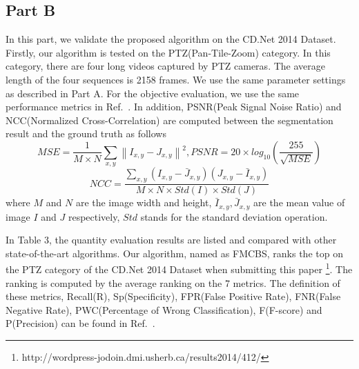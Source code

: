 \subsection{Part B}
In this part, we validate the proposed algorithm on the CD.Net 2014 Dataset\cite{CD2014}. Firstly, our algorithm is tested on the PTZ(Pan-Tile-Zoom) category. In this category, there are four long videos captured by PTZ cameras. The average length of the four sequences is 2158 frames. We use the same parameter settings as described in Part A. For the objective evaluation, we use the same performance metrics in Ref.~. In addition, PSNR(Peak Signal Noise Ratio) and NCC(Normalized Cross-Correlation) are computed between the segmentation result and the ground truth as follows $$MSE=\frac{1}{M\times N}\sum_{x,y}\left \| I_{x,y}-J_{x,y} \right \|^{2},PSNR = 20\times log_{10}\left ( \frac{255}{\sqrt{MSE}}\right )$$
$$NCC=\frac{\sum_{x,y}\left( I_{x,y}-\bar J_{x,y}\right )\left(J_{x,y}- \bar I_{x,y} \right )}{M\times N\times Std(I) \times Std(J)}$$ where $M$ and $N$ are the image width and height, $\bar I_{x,y},\bar J_{x,y}$ are the mean value of image $I$ and $J$ respectively, $Std$ stands for the standard deviation operation.\par
 In Table 3, the quantity evaluation results are listed and compared with other state-of-the-art algorithms. Our algorithm, named as FMCBS,  ranks the top on the PTZ category of the CD.Net 2014 Dataset\cite{CD2014} when submitting this paper \footnote{http://wordpress-jodoin.dmi.usherb.ca/results2014/412/}. The ranking is computed by the average ranking on the 7 metrics. The definition of these metrics, Recall(R), Sp(Specificity), FPR(False Positive Rate), FNR(False Negative Rate), PWC(Percentage of Wrong Classification), F(F-score) and P(Precision) can be found in Ref.~.

